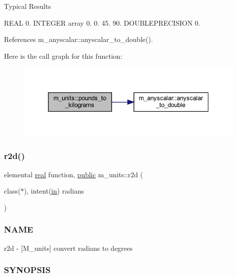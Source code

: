 Typical Results

R\+E\+AL 0. I\+N\+T\+E\+G\+ER array 0. 0. 45. 90. D\+O\+U\+B\+L\+E\+P\+R\+E\+C\+I\+S\+I\+ON 0. 

References m\+\_\+anyscalar\+::anyscalar\+\_\+to\+\_\+double().

Here is the call graph for this function\+:
\nopagebreak
\begin{figure}[H]
\begin{center}
\leavevmode
\includegraphics[width=338pt]{namespacem__units_a69c8b8d7b442cfbbe70fa384d96bebf0_cgraph}
\end{center}
\end{figure}
\mbox{\label{namespacem__units_a2fbd26061a0f20c800791796ce183475}} 
\subsubsection{\texorpdfstring{r2d()}{r2d()}}
{\footnotesize\ttfamily elemental \hyperlink{read__watch_83_8txt_abdb62bde002f38ef75f810d3a905a823}{real} function, \hyperlink{M__stopwatch_83_8txt_a2f74811300c361e53b430611a7d1769f}{public} m\+\_\+units\+::r2d (\begin{DoxyParamCaption}\item[{class($\ast$), intent(\hyperlink{M__journal_83_8txt_afce72651d1eed785a2132bee863b2f38}{in})}]{radians }\end{DoxyParamCaption})}



\subsubsection*{N\+A\+ME}

r2d -\/ \mbox{[}M\+\_\+units\mbox{]} convert radians to degrees \subsubsection*{S\+Y\+N\+O\+P\+S\+IS}

